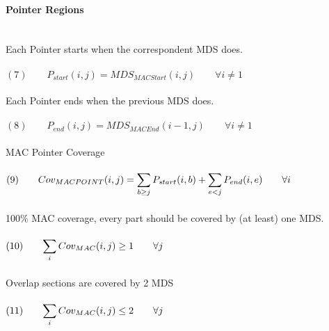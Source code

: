 \paragraph{Pointer Regions} $ $
\\\\
Each Pointer starts when the correspondent MDS does. \\\\
$(7) \qquad P_{start}(i,j) = MDS_{MACStart}(i,j) \qquad \forall i \neq 1$ \\\\
Each Pointer ends when the previous MDS does. \\\\
$(8) \qquad P_{end}(i,j) = MDS_{MACEnd}(i-1,j) \qquad \forall i \neq 1$ \\\\
MAC Pointer Coverage \\\\
$(9) \qquad Cov_{MACPOINT}(i,j) = \mathlarger{\sum_{b \geq j} P_{start}(i,b) + \sum_{e < j} P_{end}(i,e) \qquad \forall i}$ \\\\
100\% MAC coverage, every part should be covered by (at least) one MDS. \\\\
$(10) \qquad \mathlarger{\sum_{i} Cov_{MAC}(i,j) \geq 1 \qquad \forall j }$ \\\\
Overlap sections are covered by 2 MDS \\\\
$(11) \qquad \mathlarger{\sum_{i} Cov_{MAC}(i,j) \leq 2 \qquad \forall j }$ \\\\\\
\clearpage